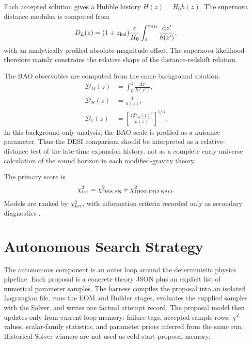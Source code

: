\documentclass[aps,prd,twocolumn,superscriptaddress,nofootinbib,longbibliography]{revtex4-2}
\newcommand{\dd}{\mathrm{d}}
\newcommand{\calD}{\mathcal{D}}
\newcommand{\DES}{\mathrm{DES}}
\newcommand{\DESI}{\mathrm{DESI}}
\newcommand{\SN}{\mathrm{SN}}
\newcommand{\BAO}{\mathrm{BAO}}
\newcommand{\chiT}{\chi^2_{\rm tot}}
\begin{document}
Each accepted solution gives a Hubble history $H(z)=H_0h(z)$.  The supernova distance modulus is computed from
\begin{equation}
D_L(z)=(1+z_{\rm hel})\frac{c}{H_0}
\int_0^{z_{\rm HD}}\frac{\dd z'}{h(z')},
\label{eq:luminosity-distance}
\end{equation}
with an analytically profiled absolute-magnitude offset.  The supernova likelihood therefore mainly constrains the relative shape of the distance-redshift relation.

The BAO observables are computed from the same background solution:
\begin{align}
\calD_M(z)&=\int_0^z\frac{\dd z'}{h(z')},\\
\calD_H(z)&=\frac{1}{h(z)},\\
\calD_V(z)&=\left[\frac{z\calD_M(z)^2}{h(z)}\right]^{1/3}.
\label{eq:bao}
\end{align}
In this background-only analysis, the BAO scale is profiled as a nuisance parameter.  Thus the DESI comparison should be interpreted as a relative-distance test of the late-time expansion history, not as a complete early-universe calculation of the sound horizon in each modified-gravity theory.

The primary score is
\begin{equation}
\chiT=\chi^2_{\DES\text{-}\SN}+\chi^2_{\DESI\text{-DR2}\,\BAO}.
\label{eq:chi2}
\end{equation}
Models are ranked by $\chiT$, with information criteria recorded only as secondary diagnostics \cite{Akaike1974,Schwarz1978}.


\section{Autonomous Search Strategy}
\label{sec:search}

The autonomous component is an outer loop around the deterministic physics pipeline.  Each proposal is a concrete theory JSON plus an explicit list of numerical parameter samples.  The harness compiles the proposal into an isolated Lagrangian file, runs the EOM and Builder stages, evaluates the supplied samples with the Solver, and writes one factual attempt record.  The proposal model then updates only from current-loop memory: failure tags, accepted-sample rows, $\chi^2$ values, scalar-family statistics, and parameter priors inferred from the same run.  Historical Solver winners are not used as cold-start proposal memory.
\end{document}
